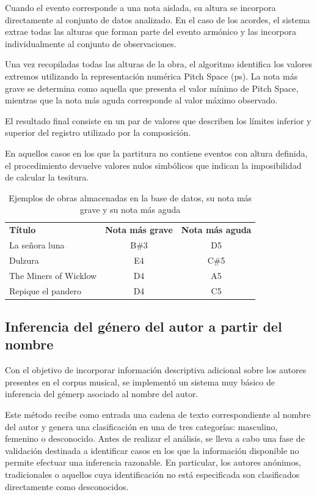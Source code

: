 Cuando el evento corresponde a una nota aislada, su altura se incorpora directamente al conjunto de datos analizado. En el caso de los acordes, el sistema extrae todas las alturas que forman parte del evento armónico y las incorpora individualmente al conjunto de observaciones.

Una vez recopiladas todas las alturas de la obra, el algoritmo identifica los valores extremos utilizando la representación numérica Pitch Space (ps). La nota más grave se determina como aquella que presenta el valor mínimo de Pitch Space, mientras que la nota más aguda corresponde al valor máximo observado.

El resultado final consiste en un par de valores que describen los límites inferior y superior del registro utilizado por la composición.

En aquellos casos en los que la partitura no contiene eventos con altura definida, el procedimiento devuelve valores nulos simbólicos que indican la imposibilidad de calcular la tesitura.

\begin{table}[H]
\centering
\begin{tabular}{lcc}
\textbf{Título} & \textbf{Nota más grave} & \textbf{Nota más aguda} \\
La señora luna & B\#3 & D5 \\
Dulzura & E4 & C\#5 \\
The Miners of Wicklow & D4 & A5 \\
Repique el pandero & D4 & C5 \\
\end{tabular}
\caption{Ejemplos de obras almacenadas en la base de datos, su nota más grave y su nota más aguda}
\end{table}

\subsection{Inferencia del género del autor a partir del nombre}
Con el objetivo de incorporar información descriptiva adicional sobre los autores presentes en el corpus musical, se implementó un sistema muy básico de inferencia del gémerp asociado al nombre del autor.

Este método recibe como entrada una cadena de texto correspondiente al nombre del autor y genera una clasificación en una de tres categorías: masculino, femenino o desconocido. Antes de realizar el análisis, se lleva a cabo una fase de validación destinada a identificar casos en los que la información disponible no permite efectuar una inferencia razonable. En particular, los autores anónimos, tradicionales o aquellos cuya identificación no está especificada son clasificados directamente como desconocidos.

